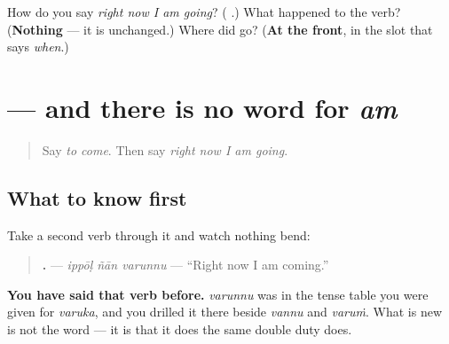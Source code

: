 \begin{tcolorbox}[breakable,colback=teal!4,colframe=teal!35!black,title={Before you move on}]
How do you say \emph{right now I am going}? (\textbf{  }.) What happened to the verb? (\textbf{Nothing} — it is unchanged.) Where did \textbf{} go? (\textbf{At the front}, in the slot that says \emph{when}.)
\end{tcolorbox}
\section[\texorpdfstring{\ml{ഇപ്പോൾ} \ml{ഞാൻ} \ml{വരുന്നു} (ippōḷ ñān varunnu)}{ഇപ്പോൾ ഞാൻ വരുന്നു (ippōḷ ñān varunnu)}]{   — and there is no word for \emph{am}}

\label{lesson:ML-C104-no-am}



\begin{quote}
Say \emph{to come}. Then say \emph{right now I am going}.
\end{quote}

\subsection*{What to know first}
Take a second verb through it and watch nothing bend:

\begin{quote}
\textbf{  .} — \emph{ippōḷ ñān varunnu} — \textquotedblleft{}Right now I am coming.\textquotedblright{}
\end{quote}

\textbf{You have said that verb before.} \emph{varunnu} was in the tense table you were given for \emph{varuka}, and you drilled it there beside \emph{vannu} and \emph{varuṁ}. What is new is not the word — it is that it does the same double duty \textbf{} does.

